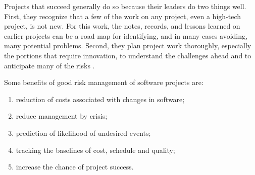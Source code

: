 Projects that succeed generally do so because their leaders do two things well. First, they recognize that a few of the work on any project, even a high-tech project, is not new. For this work, the notes, records, and lessons learned on earlier projects can be a road map for identifying, and in many cases avoiding, many potential problems. Second, they plan project work thoroughly, especially the portions that require innovation, to understand the challenges ahead and to anticipate many of the risks \cite{kendrick2003identifying}.

Some benefits of good risk management of software projects are:
\begin{enumerate}
\item reduction of costs associated with changes in software;
\item reduce management by crisis;
\item prediction of likelihood of undesired events;
\item tracking the baselines of cost, schedule and quality;
\item increase the chance of project success.
\end{enumerate}

